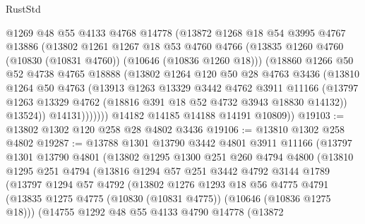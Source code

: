 \begin{lexlean}{RustStd}
\begin{coremodule}
              @1269
              @48
              @55
              @4133
              @4768
              @14778
              (@13872
                @1268
                @18
                @54
                @3995
                @4767
                @13886
                (@13802
                  @1261
                  @1267
                  @18
                  @53
                  @4760
                  @4766
                  (@13835 @1260 @4760 (@10830 (@10831 @4760)) (@10646 (@10836 @1260 @18)))
                  (@18860
                    @1266
                    @50
                    @52
                    @4738
                    @4765
                    @18888
                    (@13802
                      @1264
                      @120
                      @50
                      @28
                      @4763
                      @3436
                      (@13810
                        @1264
                        @50
                        @4763
                        (@13913
                          @1263
                          @13329
                          @3442
                          @4762
                          @3911
                          @11166
                          (@13797
                            @1263
                            @13329
                            @4762
                            (@18816 @391 @18 @52 @4732 @3943 @18830 @14132))
                          @13524))
                      @14131)))))))
        @14182
        @14185
        @14188
        @14191
        @10809))
@19103 := @13802 @1302 @120 @258 @28 @4802 @3436
@19106 := @13810 @1302 @258 @4802
@19287 := @13788
    @1301
    @13790
    @3442
    @4801
    @3911
    @11166
    (@13797
      @1301
      @13790
      @4801
      (@13802
        @1295
        @1300
        @251
        @260
        @4794
        @4800
        (@13810
          @1295
          @251
          @4794
          (@13816
            @1294
            @57
            @251
            @3442
            @4792
            @3144
            @1789
            (@13797
              @1294
              @57
              @4792
              (@13802
                @1276
                @1293
                @18
                @56
                @4775
                @4791
                (@13835 @1275 @4775 (@10830 (@10831 @4775)) (@10646 (@10836 @1275 @18)))
                (@14755
                  @1292
                  @48
                  @55
                  @4133
                  @4790
                  @14778
                  (@13872

\end{coremodule}
\end{lexlean}
